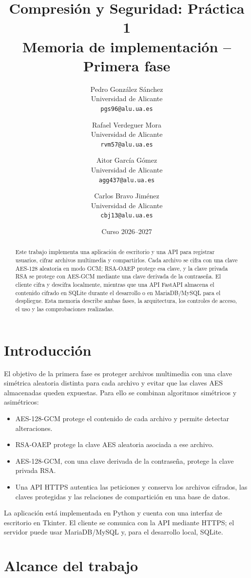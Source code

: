 \documentclass[12pt,a4paper]{article}
\title{Compresión y Seguridad: Práctica 1\\
\large Memoria de implementación -- Primera fase}
\author{
  Pedro González Sánchez \\
  Universidad de Alicante \\
  \texttt{pgs96@alu.ua.es}
  \and
  Rafael Verdeguer Mora \\
  Universidad de Alicante \\
  \texttt{rvm57@alu.ua.es}
  \and
  Aitor García Gómez \\
  Universidad de Alicante \\
  \texttt{agg437@alu.ua.es}
  \and
  Carlos Bravo Jiménez \\
  Universidad de Alicante \\
  \texttt{cbj13@alu.ua.es}
}
\date{Curso 2026--2027}
\begin{document}
\maketitle

\begin{abstract}
Este trabajo implementa una aplicación de escritorio y una API para registrar usuarios, cifrar archivos multimedia y compartirlos. Cada archivo se cifra con una clave AES-128 aleatoria en modo GCM; RSA-OAEP protege esa clave, y la clave privada RSA se protege con AES-GCM mediante una clave derivada de la contraseña. El cliente cifra y descifra localmente, mientras que una API FastAPI almacena el contenido cifrado en SQLite durante el desarrollo o en MariaDB/MySQL para el despliegue. Esta memoria describe ambas fases, la arquitectura, los controles de acceso, el uso y las comprobaciones realizadas.
\end{abstract}

\newpage

\tableofcontents
\newpage

\section{Introducción}

El objetivo de la primera fase es proteger archivos multimedia con una clave simétrica aleatoria distinta para cada archivo y evitar que las claves AES almacenadas queden expuestas. Para ello se combinan algoritmos simétricos y asimétricos:

\begin{itemize}
    \item AES-128-GCM protege el contenido de cada archivo y permite detectar alteraciones.
    \item RSA-OAEP protege la clave AES aleatoria asociada a ese archivo.
    \item AES-128-GCM, con una clave derivada de la contraseña, protege la clave privada RSA.
    \item Una API HTTPS autentica las peticiones y conserva los archivos cifrados, las claves protegidas y las relaciones de compartición en una base de datos.
\end{itemize}

La aplicación está implementada en Python y cuenta con una interfaz de escritorio en Tkinter. El cliente se comunica con la API mediante HTTPS; el servidor puede usar MariaDB/MySQL y, para el desarrollo local, SQLite.

\section{Alcance del trabajo}
\end{document}
